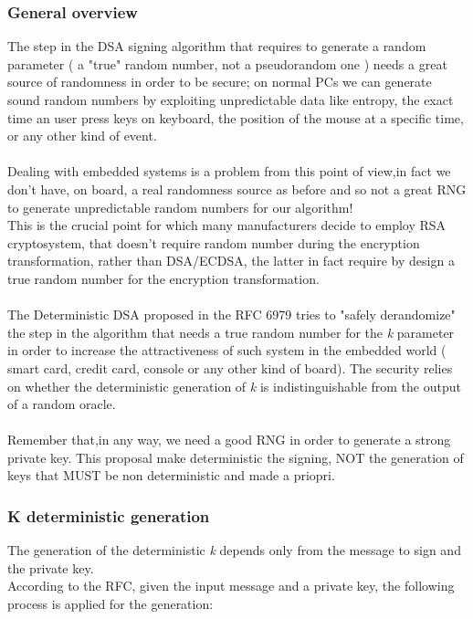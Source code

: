 \documentclass[11pt,english]{article}
\begin{document}
\subsubsection{General overview}
The step in the DSA signing algorithm that requires to generate a random parameter ( a "true" random number, not a pseudorandom one ) needs a great source of randomness in order to be secure; on normal PCs we can generate sound random numbers by exploiting unpredictable data like entropy, the exact time an user press keys on keyboard, the position of the mouse at a specific time, or any other kind of event. \\\\Dealing with embedded systems is a problem from this point of view,in fact we don't have, on board, a real randomness source as before and so not a great RNG to generate unpredictable random numbers for our algorithm! \\This is the crucial point for which many manufacturers decide to employ RSA cryptosystem, that doesn't require random number during the encryption transformation, rather than DSA/ECDSA, the latter in fact require by design a true random number for the encryption transformation.\\
\\The Deterministic DSA proposed in the RFC 6979\cite{rfc} tries to "safely derandomize" the step in the algorithm that needs a true random number for the \textit{k} parameter in order to increase the attractiveness of such system in the embedded world ( smart card, credit card, console or any other kind of board). The security relies on whether the deterministic generation of \textit{k} is indistinguishable from the output of a random oracle.\\\\
Remember that,in any way, we need a good RNG in order to generate a strong private key. 
This proposal make deterministic the signing, NOT the generation of keys that MUST be non deterministic and made a priopri.


\subsubsection{K deterministic generation}

The generation of the deterministic \textit{k} depends only from the message to sign and the private key.\\
According to the RFC, given the input message and a private key, the following process is applied for the generation:
\end{document}
